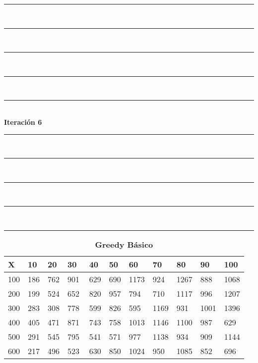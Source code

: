 \documentclass[10pt,letterpaper]{article}
\begin{document}
\newpage 
\begin{center}
\newcommand{\HRule}{\rule{\linewidth}{0.5mm}}
\center
\HRule\\[6cm]
\HRule\\[0.4cm]
\HRule\\[0.4cm]
\HRule\\[0.4cm]
\HRule\\[0.4cm]
{\centering \Huge\bfseries Iteración 6}\\[0.4cm]
\HRule\\[0.4cm]
\HRule\\[0.4cm]
\HRule\\[0.4cm]
\HRule\\[6cm]
\HRule
\end{center}
\newpage 
{}
\begin{center}
\begin{table}\renewcommand{\arraystretch}{2.5}
\caption{\large \textbf{Greedy Básico}}
\centering
\begin{tabular} { |m{0.5cm}|m{1.3cm}|m{1.3cm}|m{1.3cm}|m{1.3cm}|m{1.3cm}|m{1.3cm}|m{1.3cm}|m{1.3cm}|m{1.3cm}|m{1.3cm}|} 
\hline
\rowcolor{Gray}
\centering \textbf{X} & \centering \textbf{10} & \centering \textbf{20} & \centering \textbf{30}\ & \centering \textbf{40} & \centering \textbf{50} & \centering \textbf{60}\ & \centering \textbf{70} & \centering \textbf{80} & \centering \textbf{90}\ & \textbf{100} \\\hline
\cellcolor{Gray}100 & \Large 186 & \Large 762 & \Large 901 & \Large 629 & \Large 690 & \Large 1173 & \Large 924 & \Large 1267 & \Large 888 & \Large 1068 \\
\hline
\cellcolor{Gray}200 & \Large 199 & \Large 524 & \Large 652 & \Large 820 & \Large 957 & \Large 794 & \Large 710 & \Large 1117 & \Large 996 & \Large 1207 \\
\hline
\cellcolor{Gray}300 & \Large 283 & \Large 308 & \Large 778 & \Large 599 & \Large 826 & \Large 595 & \Large 1169 & \Large 931 & \Large 1001 & \Large 1396 \\
\hline
\cellcolor{Gray}400 & \Large 405 & \Large 471 & \Large 871 & \Large 743 & \Large 758 & \Large 1013 & \Large 1146 & \Large 1100 & \Large 987 & \Large 629 \\
\hline
\cellcolor{Gray}500 & \Large 291 & \Large 545 & \Large 795 & \Large 541 & \Large 571 & \Large 977 & \Large 1138 & \Large 934 & \Large 909 & \Large 1144 \\
\hline
\cellcolor{Gray}600 & \Large 217 & \Large 496 & \Large 523 & \Large 630 & \Large 850 & \Large 1024 & \Large 950 & \Large 1085 & \Large 852 & \Large 696 \\

\end{tabular}
\end{table}
\end{center}
\end{document}
